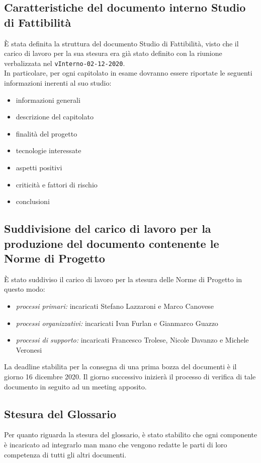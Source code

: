 	\subsection{Caratteristiche del documento interno Studio di Fattibilità}
	È stata definita la struttura del documento Studio di Fattibilità, visto che il carico di lavoro per la sua stesura era già stato definito con la riunione verbalizzata nel \verb|vInterno-02-12-2020|.\\
	In particolare, per ogni capitolato in esame dovranno essere riportate le seguenti informazioni inerenti al suo studio:
	\begin{itemize}
		\item informazioni generali
		\item descrizione del capitolato
		\item finalità del progetto
		\item tecnologie interessate
		\item aspetti positivi
		\item criticità e fattori di rischio
		\item conclusioni
	\end{itemize}
	
	\subsection{Suddivisione del carico di lavoro per la produzione del documento contenente le Norme di Progetto}
	È stato suddiviso il carico di lavoro per la stesura delle Norme di Progetto in questo modo:
	\begin{itemize}
		\item \textit{processi primari:} incaricati Stefano Lazzaroni e Marco Canovese
		\item \textit{processi organizzativi:} incaricati Ivan Furlan e Gianmarco Guazzo
		\item \textit{processi di supporto:} incaricati Francesco Trolese, Nicole Davanzo e Michele Veronesi
	\end{itemize}
	La deadline stabilita per la consegna di una prima bozza del documenti è il giorno 16 dicembre 2020. Il giorno successivo inizierà il processo di verifica di tale documento in seguito ad un meeting apposito.

	\subsection{Stesura del Glossario}
	Per quanto riguarda la stesura del glossario, è stato stabilito che ogni componente è incaricato ad integrarlo man mano che vengono redatte le parti di loro competenza di tutti gli altri documenti.
	
